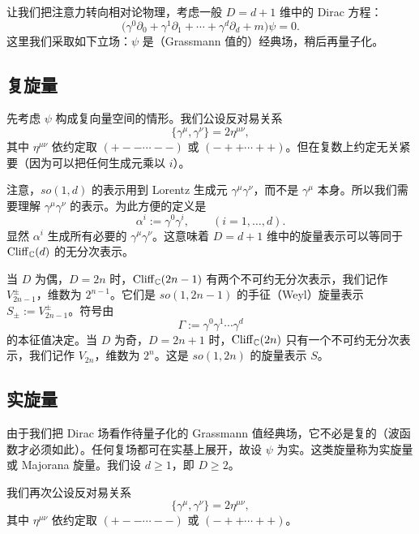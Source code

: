 让我们把注意力转向相对论物理，考虑一般 $D=d+1$ 维中的 Dirac 方程：
\begin{equation}
  \bigl(\gamma^0\partial_0+\gamma^1\partial_1+\cdots+\gamma^d\partial_d+m\bigr)\psi=0.
  \tag{10.35}
\end{equation}
这里我们采取如下立场：$\psi$ 是（Grassmann 值的）经典场，稍后再量子化。

\subsection{复旋量}

先考虑 $\psi$ 构成复向量空间的情形。我们公设反对易关系
\begin{equation}
  \{\gamma^\mu,\gamma^\nu\}=2\eta^{\mu\nu},
  \tag{10.36}
\end{equation}
其中 $\eta^{\mu\nu}$ 依约定取 $(+--\cdots--)$ 或 $(-++\cdots++)$。但在复数上约定无关紧要（因为可以把任何生成元乘以 $i$）。

注意，$so(1,d)$ 的表示用到 Lorentz 生成元 $\gamma^\mu\gamma^\nu$，而不是 $\gamma^\mu$ 本身。所以我们需要理解 $\gamma^\mu\gamma^\nu$ 的表示。为此方便的定义是
\begin{equation}
  \alpha^i:=\gamma^0\gamma^i,\qquad(i=1,\dots,d).
  \tag{10.37}
\end{equation}
显然 $\alpha^i$ 生成所有必要的 $\gamma^\mu\gamma^\nu$。这意味着 $D=d+1$ 维中的旋量表示可以等同于 $\mathrm{Cliff}_{\mathbb{C}}(d)$ 的无分次表示。

当 $D$ 为偶，$D=2n$ 时，$\mathrm{Cliff}_{\mathbb{C}}(2n-1)$ 有两个不可约无分次表示，我们记作 $V_{2n-1}^\pm$，维数为 $2^{n-1}$。它们是 $so(1,2n-1)$ 的手征（Weyl）旋量表示 $S_\pm:=V^\pm_{2n-1}$。符号由
\begin{equation}
  \Gamma:=\gamma^0\gamma^1\cdots\gamma^d
  \tag{10.38}
\end{equation}
的本征值决定。当 $D$ 为奇，$D=2n+1$ 时，$\mathrm{Cliff}_{\mathbb{C}}(2n)$ 只有一个不可约无分次表示，我们记作 $V_{2n}$，维数为 $2^n$。这是 $so(1,2n)$ 的旋量表示 $S$。

\subsection{实旋量}

由于我们把 Dirac 场看作待量子化的 Grassmann 值经典场，它不必是复的（波函数才必须如此）。任何复场都可在实基上展开，故设 $\psi$ 为实。这类旋量称为实旋量或 Majorana 旋量。我们设 $d\ge1$，即 $D\ge2$。

我们再次公设反对易关系
\begin{equation}
  \{\gamma^\mu,\gamma^\nu\}=2\eta^{\mu\nu},
  \tag{10.39}
\end{equation}
其中 $\eta^{\mu\nu}$ 依约定取 $(+--\cdots--)$ 或 $(-++\cdots++)$。

